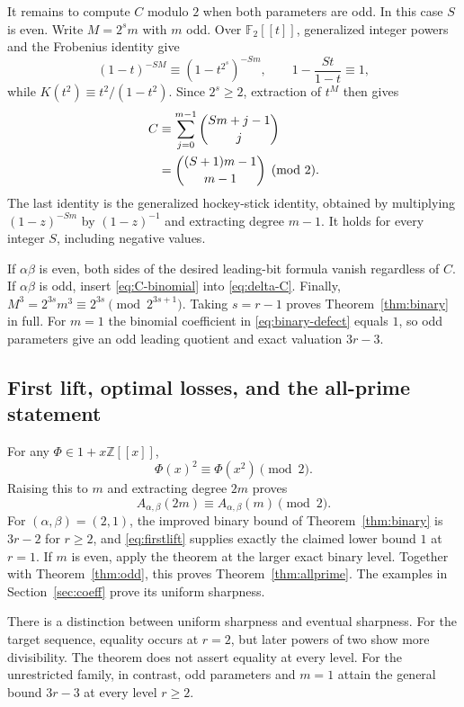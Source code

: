 \documentclass[11pt,a4paper]{article}
\numberwithin{equation}{section}
\theoremstyle{definition}
\theoremstyle{remark}
\newcommand{\Z}{\mathbb Z}
\newcommand{\A}{A_{\alpha,\beta}}
\begin{document}
It remains to compute $C$ modulo $2$ when both parameters are odd.
In this case $S$ is even. Write $M=2^s m$ with $m$ odd.
Over $\mathbb F_2[[t]]$, generalized integer powers and the Frobenius identity
give
\[
 (1-t)^{-SM}\equiv(1-t^{2^s})^{-Sm},\qquad
 1-\frac{St}{1-t}\equiv1,
\]
while $K(t^2)\equiv t^2/(1-t^2)$. Since $2^s\ge2$, extraction of $t^M$
then gives
\begin{align}\label{eq:C-binomial}
 C&\equiv\sum_{j=0}^{m-1}\binom{Sm+j-1}{j}\notag\\
  & =\binom{(S+1)m-1}{m-1}\pmod2.
\end{align}
The last identity is the generalized hockey-stick identity, obtained by
multiplying $(1-z)^{-Sm}$ by $(1-z)^{-1}$ and extracting degree $m-1$.
It holds for every integer $S$, including negative values.

If $\alpha\beta$ is even, both sides of the desired leading-bit formula
vanish regardless of $C$. If $\alpha\beta$ is odd, insert
\eqref{eq:C-binomial} into \eqref{eq:delta-C}. Finally,
$M^3=2^{3s}m^3\equiv2^{3s}\pmod{2^{3s+1}}$.
Taking $s=r-1$ proves Theorem~\ref{thm:binary} in full. For $m=1$ the binomial
coefficient in \eqref{eq:binary-defect} equals $1$, so odd parameters give
an odd leading quotient and exact valuation $3r-3$.

\subsection{First lift, optimal losses, and the all-prime statement}
For any $\Phi\in1+x\Z[[x]]$,
\[
 \Phi(x)^2\equiv\Phi(x^2)\pmod2.
\]
Raising this to $m$ and extracting degree $2m$ proves
\begin{equation}\label{eq:firstlift}
 \A(2m)\equiv\A(m)\pmod2.
\end{equation}
For $(\alpha,\beta)=(2,1)$, the improved binary bound of
Theorem~\ref{thm:binary} is $3r-2$ for $r\ge2$, and
\eqref{eq:firstlift} supplies exactly the claimed lower bound $1$ at $r=1$.
If $m$ is even, apply the theorem at the larger exact binary level.
Together with Theorem~\ref{thm:odd}, this proves
Theorem~\ref{thm:allprime}. The examples in Section~\ref{sec:coeff} prove
its uniform sharpness.

There is a distinction between uniform sharpness and eventual sharpness.
For the target sequence, equality occurs at $r=2$, but later powers of two
show more divisibility. The theorem does not assert equality at every level.
For the unrestricted family, in contrast, odd parameters and $m=1$ attain
the general bound $3r-3$ at every level $r\ge2$.
\end{document}

